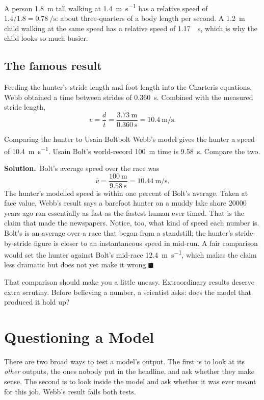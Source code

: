 \documentclass[11pt,twoside,openany]{book}
\newcommand{\solution}{\par\smallskip\noindent\textbf{Solution.}\ }
\newcommand{\qed}{\hfill$\blacksquare$}
\begin{document}
A person \SI{1.8}{\metre} tall walking at \SI{1.4}{\metre\per\second} has a relative speed of $1.4/1.8 = \SI{0.78}{\per\second}$: about three-quarters of a body length per second. A \SI{1.2}{\metre} child walking at the same speed has a relative speed of \SI{1.17}{\per\second}, which is why the child looks so much busier.

\subsection{The famous result}

Feeding the hunter's stride length and foot length into the Charteris equations, Webb obtained a time between strides of \SI{0.360}{\second}. Combined with the measured stride length,
\[
v = \frac{d}{t} = \frac{\SI{3.73}{\metre}}{\SI{0.360}{\second}} = \SI{10.4}{\metre\per\second}.
\]

\begin{example}{Comparing the hunter to Usain Bolt}{bolt}
Webb's model gives the hunter a speed of \SI{10.4}{\metre\per\second}. Usain Bolt's world-record \SI{100}{\metre} time is \SI{9.58}{\second}. Compare the two.

\solution Bolt's average speed over the race was
\[
\bar v = \frac{\SI{100}{\metre}}{\SI{9.58}{\second}} = \SI{10.44}{\metre\per\second}.
\]
The hunter's modelled speed is within one percent of Bolt's average. Taken at face value, Webb's result says a barefoot hunter on a muddy lake shore \num{20000} years ago ran essentially as fast as the fastest human ever timed. That is the claim that made the newspapers. Notice, too, what kind of speed each number is. Bolt's is an average over a race that began from a standstill; the hunter's stride-by-stride figure is closer to an instantaneous speed in mid-run. A fair comparison would set the hunter against Bolt's mid-race \SI{12.4}{\metre\per\second}, which makes the claim less dramatic but does not yet make it wrong.\qed
\end{example}

That comparison should make you a little uneasy. Extraordinary results deserve extra scrutiny. Before believing a number, a scientist asks: does the model that produced it hold up?

\section{Questioning a Model}
\label{sec:questioning}

There are two broad ways to test a model's output. The first is to look at its \emph{other} outputs, the ones nobody put in the headline, and ask whether they make sense. The second is to look inside the model and ask whether it was ever meant for this job. Webb's result fails both tests.
\end{document}
